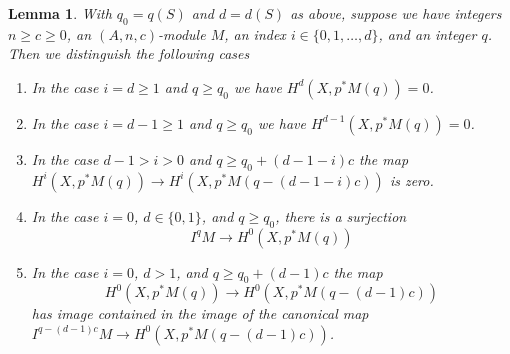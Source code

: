\documentclass{amsart}
\theoremstyle{plain}
\newtheorem{lemma}[subsection]{Lemma}
\theoremstyle{definition}
\theoremstyle{remark}
\numberwithin{equation}{subsection}
\begin{document}
\begin{lemma}
\label{lemma-vanishing-coh-almost-projective}
With $q_0 = q(S)$ and $d = d(S)$ as above, suppose we have
integers $n \geq c \geq 0$, an $(A, n, c)$-module $M$,
an index $i \in \{0, 1, \ldots, d\}$, and an integer $q$.
Then we distinguish the following cases
\begin{enumerate}
\item In the case $i = d \geq 1$ and $q \geq q_0$ we have
$H^d(X, p^*M(q)) = 0$.
\item In the case $i = d - 1 \geq 1$ and $q \geq q_0$ we have
$H^{d - 1}(X, p^*M(q)) = 0$.
\item In the case $d - 1 > i > 0$ and $q \geq q_0 + (d - 1 - i)c$
the map
$H^i(X, p^*M(q)) \to H^i(X, p^*M(q - (d - 1 - i)c))$
is zero.
\item In the case $i = 0$, $d \in \{0, 1\}$, and $q \geq q_0$, there
is a surjection
$$
I^qM \longrightarrow H^0(X, p^*M(q))
$$
\item In the case $i = 0$, $d > 1$, and $q \geq q_0 + (d - 1)c$ the map
$$
H^0(X, p^*M(q)) \to H^0(X, p^*M(q - (d - 1)c))
$$
has image contained in the image of the canonical map
$I^{q - (d - 1)c}M \to H^0(X, p^*M(q - (d - 1)c))$.
\end{enumerate}
\end{lemma}
\end{document}
